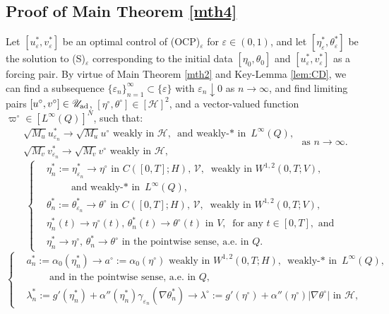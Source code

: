 \documentclass{sinst}
\numberwithin{equation}{section}
\theoremstyle{plain}
\theoremstyle{definition}
\def\sH{\mathscr{H}}
\def\sU{\mathscr{U}}
\def\sV{\mathscr{V}}
\def\ad{{\rm ad}}
\begin{document}
\subsection{Proof of Main Theorem \ref{mth4}} \label{proof4}
Let $[u_\varepsilon^*, v_\varepsilon^*]$ be an optimal control of (OCP)$_\varepsilon$ for $\varepsilon \in (0,1)$, and let $[\eta_\varepsilon^*, \theta_\varepsilon^*]$ be the solution to (S)$_\varepsilon$ corresponding to the initial data $[\eta_0, \theta_0]$ and $[u_\varepsilon^*, v_\varepsilon^*]$ as a forcing pair. By virtue of Main Theorem \ref{mth2} and Key-Lemma \ref{lem:CD}, we can find a subsequence $\{ \varepsilon_n \}_{n=1}^\infty \subset \{ \varepsilon \}$ with $\varepsilon_n \downarrow 0$ as $n \to \infty$, and find limiting pairs $[u^\circ, v^\circ] \in \sU_\ad$, $[\eta^\circ, \theta^\circ] \in [\sH]^2$, and a vector-valued function $\varpi^\circ \in [L^\infty(Q)]^N$, such that:
\begin{equation}
  \begin{gathered}
    \sqrt{M_u} u_{\varepsilon_n}^* \to \sqrt{M_u} u^\circ \mbox{ weakly in } \sH, \mbox{ and weakly-$*$ in } L^\infty(Q),
    \\
    \sqrt{M_v} v_{\varepsilon_n}^* \to \sqrt{M_v} v^\circ \mbox{ weakly in } \sH,
  \end{gathered} \mbox{ as } n \to \infty. \label{NC0_01}
\end{equation}
\begin{equation}
  \left\{ \begin{aligned}
    &\eta_n^* := \eta_{\varepsilon_n}^* \to \eta^\circ \mbox{ in } C([0,T];H), \, \sV, \ \mbox{ weakly in } W^{1,2}(0,T;V),
    \\
    &\qquad \mbox{ and weakly-$*$ in } L^\infty(Q),
    \\
    &\theta_n^* := \theta_{\varepsilon_n}^* \to \theta^\circ \mbox{ in } C([0,T];H), \, \sV, \ \mbox{ weakly in } W^{1,2}(0,T;V),
    \\
    &\eta_n^*(t) \to \eta^\circ(t), \, \theta_n^*(t) \to \theta^\circ(t) \mbox{ in } V, \ \mbox{ for any } t \in [0,T], \mbox{ and }
    \\
    &\eta_n^* \to \eta^\circ, \, \theta_n^* \to \theta^\circ \mbox{ in the pointwise sense, a.e. in } Q.
  \end{aligned} \right. \label{NC0_02}
\end{equation}
\begin{equation}
  \left\{ \begin{aligned}
    &a_n^* := \alpha_0(\eta_n^*) \to a^\circ := \alpha_0(\eta^\circ) \mbox{ weakly in } W^{1,2}(0,T;H), \mbox{ weakly-$*$ in } L^\infty(Q),
  \\
  &\qquad \mbox{ and in the pointwise sense, a.e. in } Q,
  \\
  &\lambda_n^* := g'(\eta_n^*) + \alpha''(\eta_n^*) \gamma_{\varepsilon_n} (\nabla \theta_n^*) \to \lambda^\circ := g'(\eta^\circ) + \alpha''(\eta^\circ) |\nabla \theta^\circ| \mbox{ in } \sH,
  \end{aligned} \right. \label{NC0_03}
\end{equation}
\end{document}
